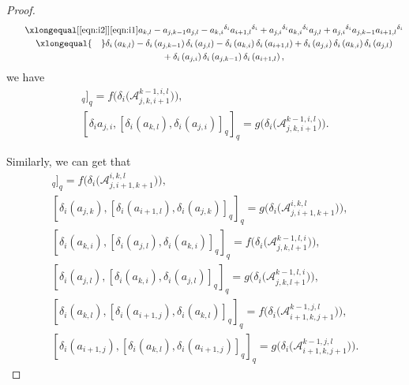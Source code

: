 \documentclass[pdftex]{sigma}
\numberwithin{equation}{section}
\def\lr#1{\left[#1\right]}
\def\lrb#1{\left(#1\right)}
\def\d{\delta}
\def\A{\mathscr{A}}
\begin{document}
\begin{proof}
\begin{gather*}
 \qquad\xlongequal[\eqref{eqn:i2}]{\eqref{eqn:i1}} a_{k,l}-a_{j,k-1}a_{j,l} -{a_{k,i}}^{\d_i}{a_{i+1,l}}^{\d_i} +{a_{j,i}}^{\d_i}{a_{k,i}}^{\d_i}a_{j,l} +{a_{j,i}}^{\d_i}a_{j,k-1}{a_{i+1,l}}^{\d_i}\\
\qquad \xlongequal{\quad} \d_i \lrb{a_{k,l} } -\d_i \lrb{a_{j,k-1}}\d_i\lrb{a_{j,l}} -\d_i\lrb{a_{k,i}}\d_i\lrb{a_{i+1,l}} +\d_i\lrb{a_{j,i}}\d_i\lrb{a_{k,i}}\d_i\lrb{a_{j,l}}\\
\qquad\qquad{}+\d_i\lrb{a_{j,i}}\d_i\lrb{a_{j,k-1}}\d_i\lrb{a_{i+1,l}},
\end{gather*}
we have
\begin{gather*}
[\d_i\lrb{a_{k, l}},\lr{\d_i\lrb{a_{j, i}}, \d_i\lrb{a_{k, l}}}_q]_q
=f\bigl(\d_i\bigl(\A_{j,k,i+1}^{k-1,i,l}\bigr)\bigr), \\
[\d_i{a_{j,i}},\lr{\d_i\lrb{a_{k,l}}, \d_i\lrb{a_{j,i}}}_q]_q
= g\bigl(\d_i\bigl(\A_{j,k,i+1}^{k-1,i,l}\bigr)\bigr).
\end{gather*}

Similarly, we can get that
\begin{gather*}
[\d_i\lrb{a_{i+1, l}},\lr{\d_i\lrb{a_{j, k}},\d_i\lrb{a_{i+1, l}}}_q]_q
=f\bigl(\d_i\bigl(\A_{j,i+1,k+1}^{i,k,l}\bigr)\bigr), \\
[\d_i\lrb{a_{j,k}},\lr{\d_i\lrb{a_{i+1,l}},\d_i\lrb{a_{j,k}}}_q]_q
= g\bigl(\d_i\bigl(\A_{j,i+1,k+1}^{i,k,l}\bigr)\bigr),\\
[\d_i\lrb{a_{k,i}},\lr{\d_i\lrb{a_{j,l}},\d_i\lrb{a_{k,i}}}_q]_q
=f\bigl(\d_i\bigl(\A_{j,k,l+1}^{k-1,l,i}\bigr)\bigr), \\
[\d_i\lrb{a_{j, l}},\lr{\d_i\lrb{a_{k, i}},\d_i\lrb{a_{j, l}}}_q]_q
= g\bigl(\d_i\bigl(\A_{j,k,l+1}^{k-1,l,i}\bigr)\bigr),\\
[\d_i\lrb{a_{k, l}},\lr{\d_i\lrb{a_{i+1, j}},\d_i\lrb{a_{k, l}}}_q]_q
=f\bigl(\d_i\bigl(\A_{i+1,k,j+1}^{k-1,j,l}\bigr)\bigr), \\
[\d_i\lrb{a_{i+1,j}},\lr{\d_i\lrb{a_{k,l}},\d_i\lrb{a_{i+1,j}}}_q]_q
= g\bigl(\d_i\bigl(\A_{i+1,k,j+1}^{k-1,j,l}\bigr)\bigr).
\end{gather*}


\end{proof}
\end{document}
